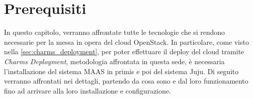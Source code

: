 \chapter{Prerequisiti}
In questo capitolo, verranno affrontate tutte le tecnologie che si rendono necessarie per la messa in opera del cloud OpenStack.
% 
In particolare, come visto nella \cref{sec:charms_deployment}, per poter effettuare il deploy del cloud tramite \emph{Charms Deployment}, metodologia affrontata in questa sede, è necessaria l'installazione del sistema MAAS in primis e poi del sistema Juju.
% 
Di seguito verranno affrontati nei dettagli, partendo da cosa sono e dal loro funzionamento fino ad arrivare alla loro installazione e configurazione.




\newpage


